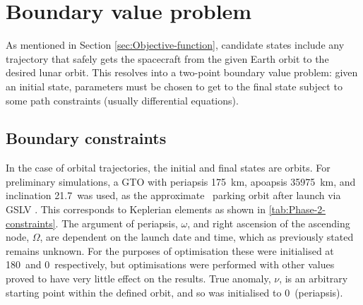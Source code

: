 
\section{Boundary value problem} \label{sec:BVP}

As mentioned in Section \ref{sec:Objective-function}, candidate states include any trajectory that safely gets the spacecraft from the given Earth orbit to the desired lunar orbit. This resolves into a two-point boundary value problem: given an initial state, parameters must be chosen to get to the final state subject to some path constraints (usually differential equations).


\subsection{Boundary constraints} \label{sub:Boundary-constraints}

In the case of orbital trajectories, the initial and final states are orbits. For preliminary simulations, a GTO with periapsis 175~km, apoapsis 35975~km, and inclination 21.7\degrees\ was used, as the approximate \BW\ parking orbit after launch via GSLV \parencite{GSLV}. This corresponds to Keplerian elements as shown in \autoref{tab:Phase-2-constraints}. The argument of periapsis, $\omega$, and right ascension of the ascending node, $\Omega$, are dependent on the launch date and time, which as previously stated remains unknown. For the purposes of optimisation these were initialised at 180\degrees\ and 0\degrees\ respectively, but optimisations were performed with other values proved to have very little effect on the results. True anomaly, $\nu$, is an arbitrary starting point within the defined orbit, and so was initialised to 0\degrees\ (periapsis).

